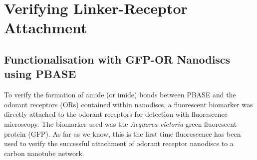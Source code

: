 \documentclass[
  a4paper,
]{scrbook}
\begin{document}
\hypertarget{sec-linker-receptor-attachment}{%
\section{Verifying Linker-Receptor
Attachment}\label{sec-linker-receptor-attachment}}

\hypertarget{sec-PBASE-GFP-OR-attachment}{%
\subsection{Functionalisation with GFP-OR Nanodiscs using
PBASE}\label{sec-PBASE-GFP-OR-attachment}}

To verify the formation of amide (or imide) bonds between PBASE and the
odorant receptors (ORs) contained within nanodiscs, a fluorescent
biomarker was directly attached to the odorant receptors for detection
with fluorescence microscopy. The biomarker used was the \emph{Aequorea
victoria} green fluorescent protein (GFP). As far as we know, this is
the first time fluorescence has been used to verify the successful
attachment of odorant receptor nanodiscs to a carbon nanotube network.
\end{document}
